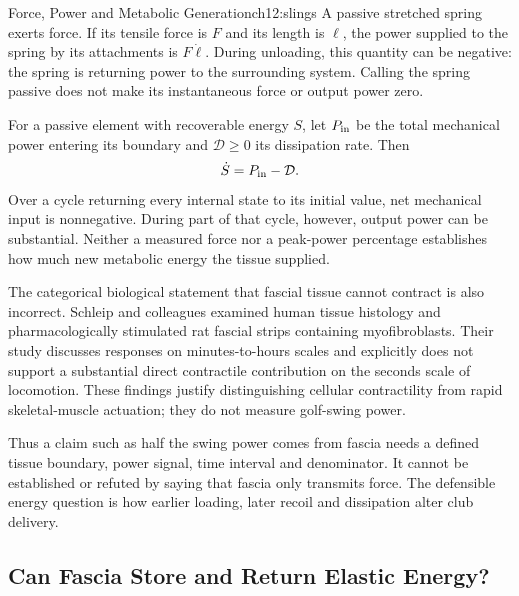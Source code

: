 \begin{mythreality}{Force, Power and Metabolic Generation}{ch12:slings}
A passive stretched spring exerts force. If its tensile force is $F$ and its length is $\ell$, the power supplied to the spring by its attachments is $F\dot\ell$. During unloading, this quantity can be negative: the spring is returning power to the surrounding system. Calling the spring passive does not make its instantaneous force or output power zero.

For a passive element with recoverable energy $S$, let $P_{\rm in}$ be the total mechanical power entering its boundary and $\mathcal D\geq0$ its dissipation rate. Then
\[
\dot S=P_{\rm in}-\mathcal D.
\]
Over a cycle returning every internal state to its initial value, net mechanical input is nonnegative. During part of that cycle, however, output power can be substantial. Neither a measured force nor a peak-power percentage establishes how much new metabolic energy the tissue supplied.

The categorical biological statement that fascial tissue cannot contract is also incorrect. Schleip and colleagues examined human tissue histology and pharmacologically stimulated rat fascial strips containing myofibroblasts. Their study discusses responses on minutes-to-hours scales and explicitly does not support a substantial direct contractile contribution on the seconds scale of locomotion. These findings justify distinguishing cellular contractility from rapid skeletal-muscle actuation; they do not measure golf-swing power. \citep{fasciaSchleip2019}

Thus a claim such as half the swing power comes from fascia needs a defined tissue boundary, power signal, time interval and denominator. It cannot be established or refuted by saying that fascia only transmits force. The defensible energy question is how earlier loading, later recoil and dissipation alter club delivery.
\end{mythreality}

\subsection{Can Fascia Store and Return Elastic Energy?}

